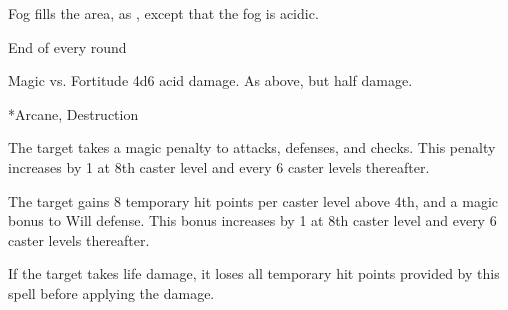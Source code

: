 \begin{spellheader}
\end{spellheader}
\begin{spelleffects}
    \spelleffect Fog fills the area, as , except that the fog is acidic.
    \begin{spelltrigger}{End of every round}
        \begin{spellattack}{Magic vs. Fortitude}
            \spellsuccess 4d6 acid damage.
            \spellfailure As above, but half damage.
        \end{spellattack}
    \end{spelltrigger}
    \spelldur{\durshort}
\end{spelleffects}
\begin{spellfooter}
    *{Arcane, Destruction}
\end{spellfooter}

\begin{spellheader}
\end{spellheader}
\begin{spelleffects}
    \spelleffect The target takes a  magic penalty to attacks, defenses, and checks. This penalty increases by 1 at 8th caster level and every 6 caster levels thereafter.
    \spelldur{\durshort}
\end{spelleffects}
\begin{spellfooter}
\end{spellfooter}

\begin{spellheader}
\end{spellheader}
\begin{spelleffects}
    \spelleffect The target gains 8 temporary hit points  per caster level above 4th, and a  magic bonus to Will defense. This bonus increases by 1 at 8th caster level and every 6 caster levels thereafter.
    \spelldur{\durshort}
\end{spelleffects}
\begin{spellfooter}
    \spellnotes If the target takes life damage, it loses all temporary hit points provided by this spell before applying the damage.
\end{spellfooter}

